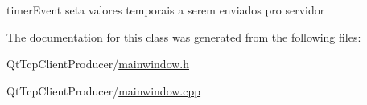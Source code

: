 timer\+Event seta valores temporais a serem enviados pro servidor 



The documentation for this class was generated from the following files\+:\begin{DoxyCompactItemize}
\item 
Qt\+Tcp\+Client\+Producer/\hyperlink{mainwindow_8h}{mainwindow.\+h}\item 
Qt\+Tcp\+Client\+Producer/\hyperlink{mainwindow_8cpp}{mainwindow.\+cpp}\end{DoxyCompactItemize}
